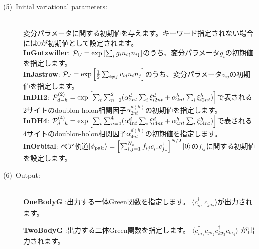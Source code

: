 \begin{description}
\item[(5)~Initial variational parameters:]
~\\ 変分パラメータに関する初期値を与えます。キーワード指定されない場合には$0$が初期値として設定されます。
~\\{\bf InGutzwiller}: ${\cal P}_G=\exp\left[ \sum_i g_i n_{i\uparrow} n_{i\downarrow} \right]$のうち、変分パラメータ$g_i$の初期値を指定します。
~\\{\bf InJastrow}: ${\cal P}_J=\exp\left[\frac{1}{2} \sum_{i\neq j} v_{ij} n_i n_j\right]$のうち、変分パラメータ$v_{ij}$の初期値を指定します。
~\\{\bf InDH2}:  ${\cal P}_{d-h}^{(2)}= \exp \left[ \sum_t \sum_{n=0}^2 (\alpha_{2nt}^d \sum_{i}\xi_{i2nt}^d+\alpha_{2nt}^h \sum_{i}\xi_{i2nt}^h)\right]$で表される2サイトのdoublon-holon相関因子$\alpha_{2nt}^{d(h)}$の初期値を指定します。
~\\{\bf InDH4}:  ${\cal P}_{d-h}^{(4)}= \exp \left[ \sum_t \sum_{n=0}^4 (\alpha_{4nt}^d \sum_{i}\xi_{i4nt}^d+\alpha_{4nt}^h \sum_{i}\xi_{i4nt}^h)\right]$で表される4サイトのdoublon-holon相関因子$\alpha_{4nt}^{d(h)}$の初期値を指定します。
~\\{\bf InOrbital}: ペア軌道$|\phi_{\rm pair} \rangle = \left[\sum_{i, j=1}^{N_s} f_{ij}c_{i\uparrow}^{\dag}c_{j\downarrow}^{\dag} \right]^{N/2}|0 \rangle$の$ f_{ij}$に関する初期値を設定します。

\item[(6)~Output:]
~\\{\bf OneBodyG }:出力する一体Green関数を指定します。
 $\langle c^{\dagger}_{i\sigma_1}c_{j\sigma_2}\rangle$が出力されます。

 {\bf TwoBodyG }:出力する二体Green関数を指定します。
 $\langle c^{\dagger}_{i\sigma_1}c_{j\sigma_2}c^{\dagger}_{k \sigma_3}c_{l\sigma_4}\rangle$
が出力されます。
\end{description}

